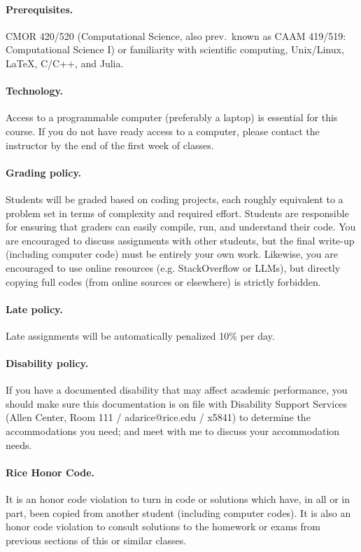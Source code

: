 \documentclass[10pt]{article}
\begin{document}
\paragraph{Prerequisites.} CMOR 420/520 (Computational Science, also prev.\ known as CAAM 419/519: Computational Science I) or familiarity with scientific computing, Unix/Linux, \LaTeX, C/C++, and Julia.

\paragraph{Technology.} Access to a programmable computer (preferably a laptop) is essential for this course. If you do not have ready access to a computer, please contact the instructor by the end of the first week of classes. 

\paragraph{Grading policy.} Students will be graded based on coding projects, each roughly equivalent to a problem set in terms of complexity and required effort. Students are responsible for ensuring that graders can easily compile, run, and understand their code. You are encouraged to discuss assignments with other students, but the final write-up (including computer code) must be entirely your own work. Likewise, you are encouraged to use online resources (e.g. StackOverflow or LLMs), but directly copying full codes (from online sources or elsewhere) is strictly forbidden. 

\paragraph{Late policy.} Late assignments will be automatically penalized 10\% per day. 

\paragraph{Disability policy.} If you have a documented disability that may affect academic performance, you should make sure this documentation is on file with Disability Support Services (Allen Center, Room 111 / adarice@rice.edu / x5841) to determine the accommodations you need; and meet with me to discuss your accommodation needs.

\paragraph{Rice Honor Code.} It is an honor code violation to turn in code or solutions which have, in all or in part, been copied from another student (including computer codes). It is also an honor code violation to consult solutions to the homework or exams from previous sections of this or similar classes. 
\end{document}
